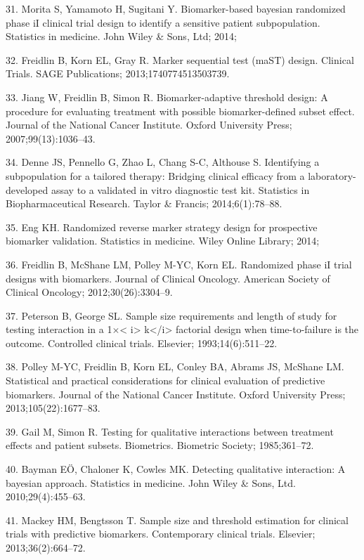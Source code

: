 \documentclass[11pt]{article}
\begin{document}
31. Morita S, Yamamoto H, Sugitani Y. Biomarker-based bayesian
randomized phase iI clinical trial design to identify a sensitive
patient subpopulation. Statistics in medicine. John Wiley \& Sons, Ltd;
2014;

32. Freidlin B, Korn EL, Gray R. Marker sequential test (maST) design.
Clinical Trials. SAGE Publications; 2013;1740774513503739.

33. Jiang W, Freidlin B, Simon R. Biomarker-adaptive threshold design: A
procedure for evaluating treatment with possible biomarker-defined
subset effect. Journal of the National Cancer Institute. Oxford
University Press; 2007;99(13):1036--43.

34. Denne JS, Pennello G, Zhao L, Chang S-C, Althouse S. Identifying a
subpopulation for a tailored therapy: Bridging clinical efficacy from a
laboratory-developed assay to a validated in vitro diagnostic test kit.
Statistics in Biopharmaceutical Research. Taylor \& Francis;
2014;6(1):78--88.

35. Eng KH. Randomized reverse marker strategy design for prospective
biomarker validation. Statistics in medicine. Wiley Online Library;
2014;

36. Freidlin B, McShane LM, Polley M-YC, Korn EL. Randomized phase iI
trial designs with biomarkers. Journal of Clinical Oncology. American
Society of Clinical Oncology; 2012;30(26):3304--9.

37. Peterson B, George SL. Sample size requirements and length of study
for testing interaction in a 1\(\times\)\textless{} i\textgreater{}
k\textless{}/i\textgreater{} factorial design when time-to-failure is
the outcome. Controlled clinical trials. Elsevier; 1993;14(6):511--22.

38. Polley M-YC, Freidlin B, Korn EL, Conley BA, Abrams JS, McShane LM.
Statistical and practical considerations for clinical evaluation of
predictive biomarkers. Journal of the National Cancer Institute. Oxford
University Press; 2013;105(22):1677--83.

39. Gail M, Simon R. Testing for qualitative interactions between
treatment effects and patient subsets. Biometrics. Biometric Society;
1985;361--72.

40. Bayman EÖ, Chaloner K, Cowles MK. Detecting qualitative interaction:
A bayesian approach. Statistics in medicine. John Wiley \& Sons, Ltd.
2010;29(4):455--63.

41. Mackey HM, Bengtsson T. Sample size and threshold estimation for
clinical trials with predictive biomarkers. Contemporary clinical
trials. Elsevier; 2013;36(2):664--72.
\end{document}
